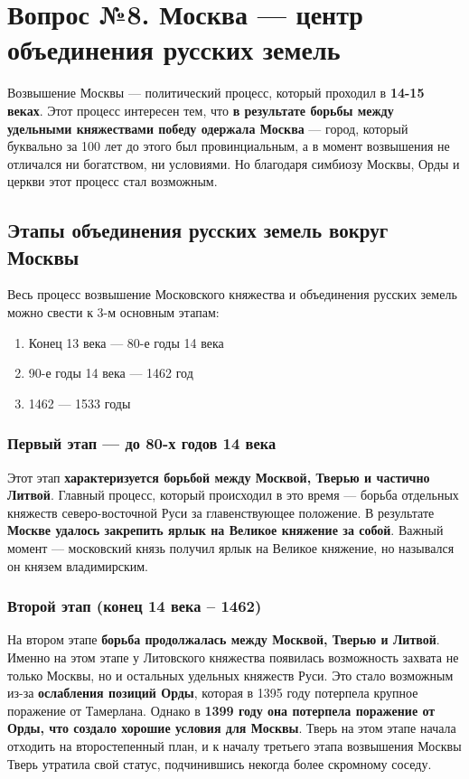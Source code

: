 \documentclass{article}
\begin{document}
\pagebreak
\section{Вопрос №8. Москва — центр объединения русских земель}

Возвышение Москвы — политический процесс, который проходил в \textbf{14-15 веках}. Этот процесс интересен тем, что \textbf{в результате борьбы между удельными княжествами победу одержала Москва} — город, который буквально за 100 лет до этого был провинциальным, а в момент возвышения не отличался ни богатством, ни условиями. Но благодаря симбиозу Москвы, Орды и церкви этот процесс стал возможным.

\subsection{Этапы объединения русских земель вокруг Москвы}

Весь процесс возвышение Московского княжества и объединения русских земель можно свести к 3-м основным этапам:

\begin{enumerate}
    \item Конец 13 века — 80-е годы 14 века
    \item 90-е годы 14 века — 1462 год
    \item 1462 — 1533 годы
\end{enumerate}

\subsubsection{Первый этап — до 80-х годов 14 века}

Этот этап \textbf{характеризуется борьбой между Москвой, Тверью и частично Литвой}. Главный процесс, который происходил в это время — борьба отдельных княжеств северо-восточной Руси за главенствующее положение. В результате \textbf{Москве удалось закрепить ярлык на Великое княжение за собой}. Важный момент — московский князь получил ярлык на Великое княжение, но назывался он князем владимирским.

\subsubsection{Второй этап (конец 14 века – 1462)}

На втором этапе \textbf{борьба продолжалась между Москвой, Тверью и Литвой}. Именно на этом этапе у Литовского княжества появилась возможность захвата не только Москвы, но и остальных удельных княжеств Руси. Это стало возможным из-за \textbf{ослабления позиций Орды}, которая в 1395 году потерпела крупное поражение от Тамерлана. Однако в \textbf{1399 году она потерпела поражение от Орды, что создало хорошие условия для Москвы}. Тверь на этом этапе начала отходить на второстепенный план, и к началу третьего этапа возвышения Москвы Тверь утратила свой статус, подчинившись некогда более скромному соседу.
\end{document}
